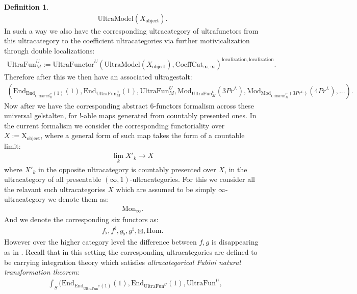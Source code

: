 \documentclass[12pt]{article}
\theoremstyle{definition}
\newtheorem{definition}{Definition}
\begin{document}
\begin{definition}
\begin{align}
\mathrm{UltraModel}(X_\mathrm{object}).
\end{align}
In such a way we also have the corresponding ultracategory of ultrafunctors from this ultracategory to the coefficient ultracategories via further motivicalization through double localizations:
\begin{align}
\mathrm{UltraFun}_M^U:=\mathrm{UltraFunctor}^U(\mathrm{UltraModel}(X_\mathrm{object}),\mathrm{CoeffCat}_{\infty,\infty})^{\mathrm{localization}, \mathrm{localization}}.
\end{align}
Therefore after this we then have an associated ultragestalt:
\begin{align}
(\mathrm{End}_{\mathrm{End}_{\mathrm{UltraFun}_M^U}(1)}(1),\mathrm{End}_{\mathrm{UltraFun}_M^U}(1),\mathrm{UltraFun}_M^U,\mathrm{Mod}_{\mathrm{UltraFun}_M^U}(3Pr^L),\mathrm{Mod}_{\mathrm{Mod}_{\mathrm{UltraFun}_M^U}(3Pr^L)}(4Pr^L),...).
\end{align}
Now after \cite{5S5} we have the corresponding abstract 6-functors formalism across these universal gelstalten, for $!$-able maps generated from countably presented ones. In the current formalism we consider the corresponding functoriality over $X:=\mathrm{X}_\mathrm{object}$, where a general form of such map takes the form of a countable limit:
\begin{align}
\lim_k X'_k \rightarrow X
\end{align}
where $X'_k$ in the opposite ultracategory is countably presented over $X$, in the ultracategory of all presentable $(\infty,1)$-ultracategories. For this we consider all the relavant such ultracategories $X$ which are assumed to be simply $\infty$-ultracategory we denote them as:
\begin{align}
\mathrm{Mon}_\infty.
\end{align}
And we denote the corresponding six functors as:
\begin{align}
f_\flat, f^\sharp, g_\flat, g^\sharp, \boxtimes, \mathrm{Hom}.  
\end{align}
However over the higher category level the difference between $f,g$ is disappearing as in \cite{5S5}. Recall that in this setting the corresponding ultracategories are defined to be carrying integration theory which satisfies \textit{ultracategorical Fubini natural transformation theorem}:
\begin{align}
&\int_S (\mathrm{End}_{\mathrm{End}_{\mathrm{UltraFun}^U}(1)}(1),\mathrm{End}_{\mathrm{UltraFun}^U}(1),\mathrm{UltraFun}^U,\\

\end{align}
\end{definition}
\end{document}
